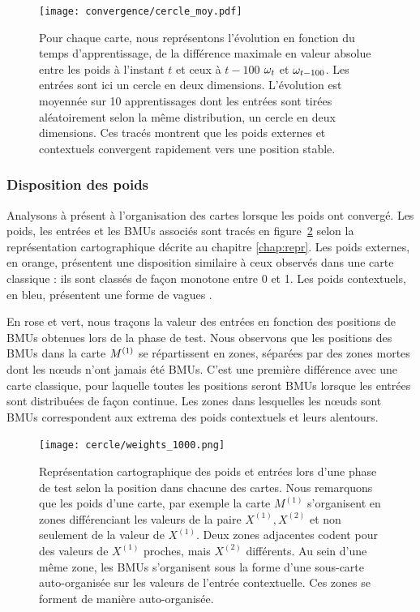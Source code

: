 \documentclass[../main]{subfiles}
\begin{document}
\begin{figure}[h!]
	\texttt{[image: convergence/cercle\_moy.pdf]}
	\caption{Pour chaque carte, nous représentons l'évolution en fonction du temps d'apprentissage, de la différence maximale en valeur absolue entre les poids à l'instant $t$ et ceux à $t-100$ $\omega_t$ et $\omega_{t-100}$. Les entrées sont ici un cercle en deux dimensions. L'évolution est moyennée sur 10 apprentissages dont les entrées sont tirées aléatoirement selon la même distribution, un cercle en deux dimensions.
	Ces tracés montrent que les poids externes et contextuels convergent rapidement vers une position stable.\label{fig:conv}}
\end{figure}


\subsubsection{Disposition des poids}

Analysons à présent à l'organisation des cartes lorsque les poids ont convergé.
Les poids, les entrées et les BMUs associés sont tracés en figure~\ref{fig:w} selon la représentation cartographique décrite au chapitre \ref{chap:repr}.
Les poids externes, en orange, présentent une disposition similaire à ceux observés dans une carte classique : ils sont classés de façon monotone entre 0 et 1.
Les poids contextuels, en bleu, présentent une forme de \og vagues \fg{}. 

En rose et vert, nous traçons la valeur des entrées en fonction des positions de BMUs obtenues lors de la phase de test.
Nous observons que les positions des BMUs dans la carte $M^{({1})}$ se répartissent en zones, séparées par des zones mortes dont les n\oe{}uds n'ont jamais été BMUs. C'est une première différence avec une carte classique, pour laquelle toutes les positions seront BMUs lorsque les entrées sont distribuées de façon continue.
Les zones dans lesquelles les n\oe{}uds sont BMUs correspondent aux extrema des poids contextuels et leurs alentours.

\begin{figure}[ht!]
	\centering\texttt{[image: cercle/weights\_1000.png]}
	\caption{Représentation cartographique des poids et entrées lors d'une phase de test selon la position dans chacune des cartes. Nous remarquons que les poids d'une carte, par exemple la carte $M^{(1)}$ s'organisent en zones différenciant les valeurs de la paire $X^{(1)}, X^{(2)}$ et non seulement de la valeur de $X^{(1)}$. Deux zones adjacentes codent pour des valeurs de $X^{(1)}$ proches, mais $X^{(2)}$ différents. Au sein d'une même zone, les BMUs s'organisent sous la forme d'une sous-carte auto-organisée sur les valeurs de l'entrée contextuelle. Ces zones se forment de manière auto-organisée. \label{fig:w}}
\end{figure}
\end{document}
